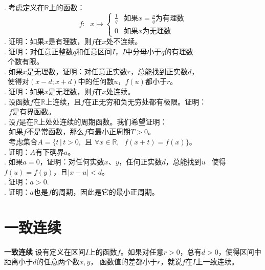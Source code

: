 \documentclass[12pt,UTF8,fontset=none]{ctexbook}
\begin{document}
\begin{appendix}
\begin{xt}
    \mbox{} \\
    . 考虑定义在$\mathbb{R}$上的函数：
    $$ f: \;\,\, x\mapsto \left\{
    \begin{array}{cl}
        \frac{1}{q} & \mbox{如果}x = \frac{p}{q}\mbox{为有理数} \\
        0           & \mbox{如果}x\mbox{为无理数} 
    \end{array}\right.
    $$
    . 证明：如果$x$是有理数，则$f$在$x$处不连续。\\
    . 证明：对任意正整数$q$和任意区间$I$，$I$中分母小于$q$的有理数\\
    \indent\quad\;\;\, 个数有限。\\
    . 如果$x$是无理数，证明：对任意正实数$r$，总能找到正实数$d$，\\
    \indent\quad\;\;\, 使得对$(x - d; x + d)$中的任何数$u$，$f(u)$都小于$r$。\\
    . 证明：如果$x$是无理数，则$f$在$x$处连续。\\
    . 设函数$f$在$\mathbb{R}$上连续，且$f$在正无穷和负无穷处都有极限。证明：\\
    \indent\;\;\,\, $f$是有界函数。\\
    . 设$f$是在$\mathbb{R}$上处处连续的周期函数。我们希望证明：\\
    \indent\;\;\,\, 如果$f$不是常函数，那么$f$有最小正周期$T>0$。\\
    \indent\;\;\,\, 考虑集合$A = \{t \, | \, t > 0,\;\, \mbox{且}\,\,\forall x\in\mathbb{R},\;\,\, f(x+t) = f(x)\}$。\\
    . 证明：$A$有下确界$a$。\\
    . 如果$a = 0$，证明：对任何实数$x$、$y$，任何正实数$d$，总能找到$u$
    \indent\quad\;\;\, 使得$f(u) = f(y)$，且$|x - u| < d$。\\
    . 证明：$a > 0.$\\
    . 证明：$a$也是$f$的周期，因此是它的最小正周期。
\end{xt}

\section{一致连续}

\begin{df}{\textbf{一致连续}}\label{df:b-2-10}
    设有定义在区间$I$上的函数$f$。如果对任意$r>0$，总有$d>0$，使得区间中距离小于$d$的任意两个数$x,y$，
    函数值的差都小于$r$，就说$f$在$I$上一致连续。
\end{df}


\end{appendix}
\end{document}
